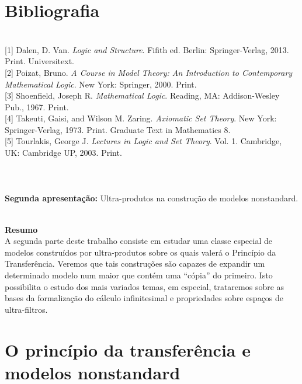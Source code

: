 \documentclass[11pt,a4paper]{article}
\theoremstyle{definition}
\begin{document}
\section{Bibliografia}

\ \\


[1] Dalen, D. Van.\textit{ Logic and Structure}. Fifith ed. Berlin: Springer-Verlag, 2013. Print. Universitext. \\

[2] Poizat, Bruno. \textit{A Course in Model Theory: An Introduction to Contemporary Mathematical Logic}. New York: Springer, 2000. Print. \\

[3] Shoenfield, Joseph R. \textit{Mathematical Logic}. Reading, MA: Addison-Wesley Pub., 1967. Print. \\

[4] Takeuti, Gaisi, and Wilson M. Zaring. \textit{Axiomatic Set Theory}. New York: Springer-Verlag, 1973. Print. Graduate Text in Mathematics 8. \\

[5] Tourlakis, George J. \textit{Lectures in Logic and Set Theory}. Vol. 1. Cambridge, UK: Cambridge UP, 2003. Print. \\


\ \\

\ \\

\ \\


{\Large  \textbf{Segunda apresentação:} Ultra-produtos na construção de modelos nonstandard.}

\ \\

{\Large \textbf{Resumo}}  \\


{\small A segunda parte deste trabalho consiste em estudar uma classe especial de modelos construídos por ultra-produtos sobre os quais valerá o Princípio da Transferência. Veremos que tais construções são capazes de expandir um determinado modelo num maior que contém uma ``cópia'' do primeiro. Isto possibilita o estudo dos mais variados temas, em especial, trataremos sobre as bases da formalização do cálculo infinitesimal e propriedades sobre espaços de ultra-filtros.}

\section{O princípio da transferência e modelos nonstandard}
\end{document}
